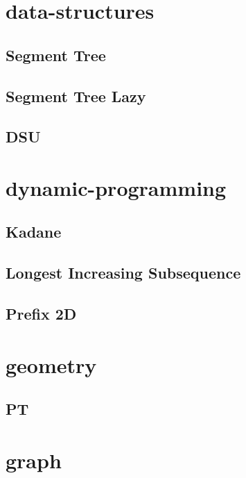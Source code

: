 \section{data-structures}
\subsection{Segment Tree}
\raggedbottom
\hrulefill
\subsection{Segment Tree Lazy}
\raggedbottom
\hrulefill
\subsection{DSU}
\raggedbottom
\hrulefill

\section{dynamic-programming}
\subsection{Kadane}
\raggedbottom
\hrulefill
\subsection{Longest Increasing Subsequence}
\raggedbottom
\hrulefill
\subsection{Prefix 2D}
\raggedbottom
\hrulefill

\section{geometry}
\subsection{PT}
\raggedbottom
\hrulefill

\section{graph}
